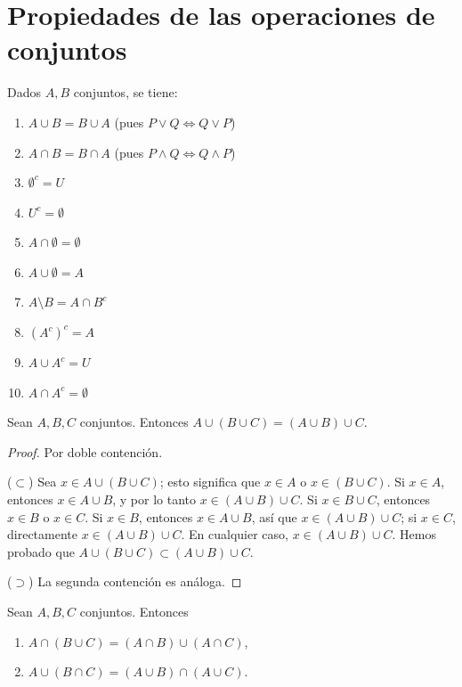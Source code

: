 \documentclass[12pt,a4paper]{book}
\begin{document}
    \section{Propiedades de las operaciones de conjuntos}

    \begin{teorema}
        Dados $A,B$ conjuntos, se tiene:
        \begin{enumerate}[label=(\arabic*)]
            \item $A\cup B = B\cup A$ \quad (pues $P\vee Q \Leftrightarrow Q\vee P$)
            \item $A\cap B = B\cap A$ \quad (pues $P\wedge Q \Leftrightarrow Q\wedge P$)
            \item $\emptyset^c = U$
            \item $U^c = \emptyset$
            \item $A\cap \emptyset = \emptyset$
            \item $A\cup \emptyset = A$
            \item $A\setminus B = A\cap B^c$
            \item $(A^c)^c = A$
            \item $A\cup A^c = U$
            \item $A\cap A^c = \emptyset$
        \end{enumerate}
    \end{teorema}

    \begin{proposicion}
        Sean $A,B,C$ conjuntos. Entonces $A\cup(B\cup C) = (A\cup B)\cup C$.
    \end{proposicion}

    \begin{proof}
        Por doble contención.

        ($\subset$) Sea $x\in A\cup(B\cup C)$; esto significa que $x\in A$ o $x\in(B\cup C)$. Si $x\in A$, entonces $x\in A\cup B$, y por lo tanto $x\in (A\cup B)\cup C$. Si $x\in B\cup C$, entonces $x\in B$ o $x\in C$. Si $x\in B$, entonces $x\in A\cup B$, así que $x\in(A\cup B)\cup C$; si $x\in C$, directamente $x\in(A\cup B)\cup C$. En cualquier caso, $x\in(A\cup B)\cup C$. Hemos probado que $A\cup(B\cup C) \subset (A\cup B)\cup C$.

        ($\supset$) La segunda contención es análoga.
    \end{proof}

    \begin{proposicion}
        Sean $A,B,C$ conjuntos. Entonces
        \begin{enumerate}[label=(\roman*)]
            \item $A\cap(B\cup C) = (A\cap B)\cup(A\cap C)$,
            \item $A\cup(B\cap C) = (A\cup B)\cap(A\cup C)$.
        \end{enumerate}
    \end{proposicion}
\end{document}
